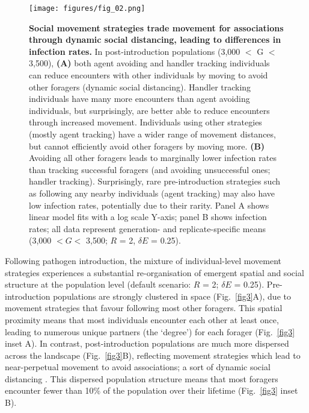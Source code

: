 \begin{figure}[!h]
    \centering
    \texttt{[image: figures/fig\_02.png]}
    \caption{
        \textbf{Social movement strategies trade movement for associations through dynamic social distancing, leading to differences in infection rates.}
        In post-introduction populations (3,000 $<$ G $<$ 3,500), \textbf{(A)} both agent avoiding and handler tracking individuals can reduce encounters with other individuals by moving to avoid other foragers (dynamic social distancing).
        Handler tracking individuals have many more encounters than agent avoiding individuals, but surprisingly, are better able to reduce encounters through increased movement.
        Individuals using other strategies (mostly agent tracking) have a wider range of movement distances, but cannot efficiently avoid other foragers by moving more.
        \textbf{(B)} Avoiding all other foragers leads to marginally lower infection rates than tracking successful foragers (and avoiding unsuccessful ones; handler tracking).
        Surprisingly, rare pre-introduction strategies such as following any nearby individuals (agent tracking) may also have low infection rates, potentially due to their rarity.
        Panel A shows linear model fits with a log scale Y-axis; panel B shows infection rates; all data represent generation- and replicate-specific means (3,000 $< G <$ 3,500; $R$ = 2, $\delta E$ = 0.25).
    }\label{fig2}
\end{figure}

Following pathogen introduction, the mixture of individual-level movement strategies experiences a substantial re-organisation of emergent spatial and social structure at the population level (default scenario: $R$ = 2; $\delta E$ = 0.25).
Pre-introduction populations are strongly clustered in space (Fig.~\ref{fig3}A), due to movement strategies that favour following most other foragers.
This spatial proximity means that most individuals encounter each other at least once, leading to numerous unique partners (the `degree') for each forager (Fig.~\ref{fig3} inset A).
In contrast, post-introduction populations are much more dispersed across the landscape (Fig.~\ref{fig3}B), reflecting movement strategies which lead to near-perpetual movement to avoid associations; a sort of dynamic social distancing \citep{pusceddu2021}.
This dispersed population structure means that most foragers encounter fewer than 10\% of the population over their lifetime (Fig.~\ref{fig3} inset B).

